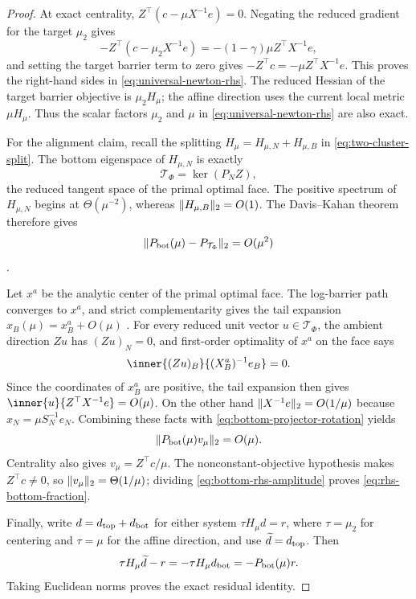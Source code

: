 \begin{proof}
At exact centrality,
$Z^\top(c-\mu X^{-1}e)=0$.  Negating the reduced gradient for the target
$\mu_2$ gives
\[
 -Z^\top(c-\mu_2X^{-1}e)
 =-(1-\gamma)\mu Z^\top X^{-1}e,
\]
and setting the target barrier term to zero gives
$-Z^\top c=-\mu Z^\top X^{-1}e$.  This proves
the right-hand sides in \eqref{eq:universal-newton-rhs}.  The reduced Hessian
of the target barrier objective is $\mu_2H_\mu$; the affine direction uses
the current local metric $\mu H_\mu$.  Thus the scalar factors $\mu_2$ and $\mu$ in
\eqref{eq:universal-newton-rhs} are also exact.

For the alignment claim, recall the splitting
$H_\mu=H_{\mu,N}+H_{\mu,B}$ in \eqref{eq:two-cluster-split}.  The bottom
eigenspace of $H_{\mu,N}$ is exactly
\begin{equation}
 \mathcal T_\Phi=\ker(P_NZ),
 \label{eq:face-tangent-space}
\end{equation}
the reduced tangent space of the primal optimal face.  The positive spectrum
of $H_{\mu,N}$ begins at $\Theta(\mu^{-2})$, whereas
$\lVert H_{\mu,B}\rVert_2=O(1)$.  The Davis--Kahan theorem therefore gives
\begin{equation}
 \lVert P_{\rm bot}(\mu)-P_{\mathcal T_\Phi}\rVert_2=O(\mu^2)
 \label{eq:bottom-projector-rotation}
\end{equation}
\cite{davis1970-rotation-eigenvectors-perturbation}.

Let $x^a$ be the analytic center of the primal optimal face.  The log-barrier
path converges to $x^a$, and strict complementarity gives the tail expansion
$x_B(\mu)=x_B^a+O(\mu)$
\cite{mclinden1980-analogue-moreau-proximation,wright1994-properties-hessian-logarithmic-barrier}.
For every reduced unit vector $u\in\mathcal T_\Phi$, the ambient direction
$Zu$ has $(Zu)_N=0$, and first-order optimality of $x^a$ on the face says
\[
 \inner{(Zu)_B}{(X_B^a)^{-1}e_B}=0.
\]
Since the coordinates of $x_B^a$ are positive, the tail expansion then gives
$\inner{u}{Z^\top X^{-1}e}=O(\mu)$.  On the other hand
$\lVert X^{-1}e\rVert_2=O(1/\mu)$ because $x_N=\mu S_N^{-1}e_N$.
Combining these facts with \eqref{eq:bottom-projector-rotation} yields
\begin{equation}
 \lVert P_{\rm bot}(\mu)v_\mu\rVert_2=O(\mu).
 \label{eq:bottom-rhs-amplitude}
\end{equation}
Centrality also gives $v_\mu=Z^\top c/\mu$.  The nonconstant-objective
hypothesis makes $Z^\top c\ne0$, so $\lVert v_\mu\rVert_2=\Theta(1/\mu)$; dividing
\eqref{eq:bottom-rhs-amplitude} proves \eqref{eq:rhs-bottom-fraction}.

Finally, write $d=d_{\rm top}+d_{\rm bot}$ for either system
$\tau H_\mu d=r$, where $\tau=\mu_2$ for centering and $\tau=\mu$ for the
affine direction, and use $\widetilde d=d_{\rm top}$.  Then
\[
 \tau H_\mu\widetilde d-r
 =-\tau H_\mu d_{\rm bot}=-P_{\rm bot}(\mu)r.
\]
Taking Euclidean norms proves the exact residual identity.
\end{proof}

